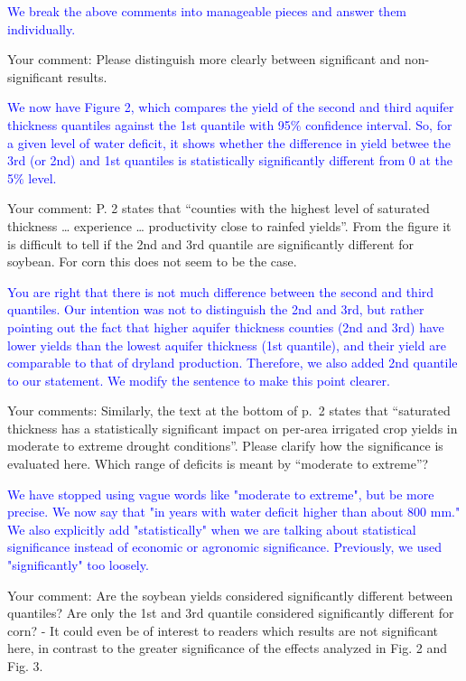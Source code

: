 \documentclass[
]{article}
\begin{document}
\textcolor{blue}{We break the above comments into manageable pieces and answer them individually.}

Your comment: Please distinguish more clearly between significant and
non-significant results.

\textcolor{blue}{
We now have Figure 2, which compares the yield of the second and third aquifer thickness quantiles against the 1st quantile with 95$\%$ confidence interval. So, for a given level of water deficit, it shows whether the difference in yield betwee the 3rd (or 2nd) and 1st quantiles is statistically significantly different from 0 at the 5$\%$ level.
}

Your comment: P. 2 states that ``counties with the highest level of
saturated thickness \ldots{} experience \ldots{} productivity close to
rainfed yields''. From the figure it is difficult to tell if the 2nd and
3rd quantile are significantly different for soybean. For corn this does
not seem to be the case.

\textcolor{blue}{
You are right that there is not much difference between the second and third quantiles. Our intention was not to distinguish the 2nd and 3rd, but rather pointing out the fact that higher aquifer thickness counties (2nd and 3rd) have lower yields than the lowest aquifer thickness (1st quantile), and their yield are comparable to that of dryland production. Therefore, we also added 2nd quantile to our statement. We modify the sentence to make this point clearer.
}

Your comments: Similarly, the text at the bottom of p.~2 states that
``saturated thickness has a statistically significant impact on per-area
irrigated crop yields in moderate to extreme drought conditions''.
Please clarify how the significance is evaluated here. Which range of
deficits is meant by ``moderate to extreme''?

\textcolor{blue}{
We have stopped using vague words like "moderate to extreme", but be more precise. We now say that "in years with water deficit higher than about 800 mm." We also explicitly add "statistically" when we are talking about statistical significance instead of economic or agronomic significance. Previously, we used "significantly" too loosely.
}

Your comment: Are the soybean yields considered significantly different
between quantiles? Are only the 1st and 3rd quantile considered
significantly different for corn? - It could even be of interest to
readers which results are not significant here, in contrast to the
greater significance of the effects analyzed in Fig. 2 and Fig. 3.
\end{document}
